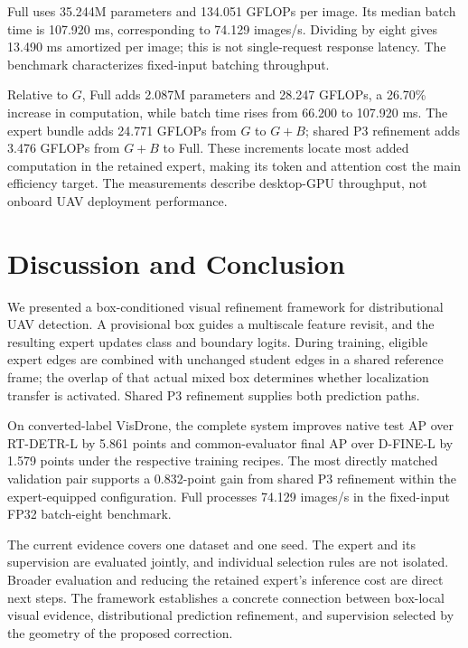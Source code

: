 
Full uses 35.244M parameters and 134.051 GFLOPs per image. Its median batch time is 107.920 ms, corresponding to 74.129 images/s. Dividing by eight gives 13.490 ms amortized per image; this is not single-request response latency. The benchmark characterizes fixed-input batching throughput.

Relative to $G$, Full adds 2.087M parameters and 28.247 GFLOPs, a 26.70\% increase in computation, while batch time rises from 66.200 to 107.920 ms. The expert bundle adds 24.771 GFLOPs from $G$ to $G+B$; shared P3 refinement adds 3.476 GFLOPs from $G+B$ to Full. These increments locate most added computation in the retained expert, making its token and attention cost the main efficiency target. The measurements describe desktop-GPU throughput, not onboard UAV deployment performance.

\section{Discussion and Conclusion}
We presented a box-conditioned visual refinement framework for distributional UAV detection. A provisional box guides a multiscale feature revisit, and the resulting expert updates class and boundary logits. During training, eligible expert edges are combined with unchanged student edges in a shared reference frame; the overlap of that actual mixed box determines whether localization transfer is activated. Shared P3 refinement supplies both prediction paths.

On converted-label VisDrone, the complete system improves native test AP over RT-DETR-L by 5.861 points and common-evaluator final AP over D-FINE-L by 1.579 points under the respective training recipes. The most directly matched validation pair supports a 0.832-point gain from shared P3 refinement within the expert-equipped configuration. Full processes 74.129 images/s in the fixed-input FP32 batch-eight benchmark.

The current evidence covers one dataset and one seed. The expert and its supervision are evaluated jointly, and individual selection rules are not isolated. Broader evaluation and reducing the retained expert's inference cost are direct next steps. The framework establishes a concrete connection between box-local visual evidence, distributional prediction refinement, and supervision selected by the geometry of the proposed correction.
